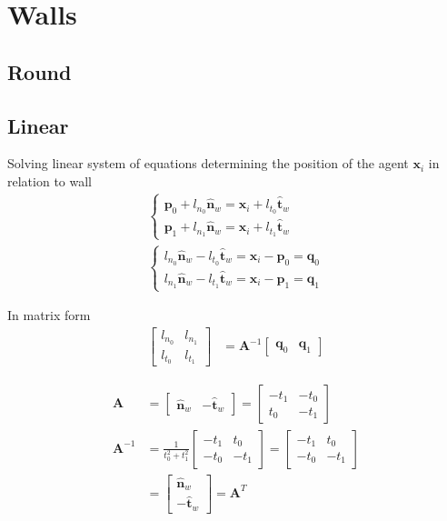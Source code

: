 \section{Walls}
\subsection{Round}

\subsection{Linear}
Solving linear system of equations determining the position of the agent $ \mathbf{x}_{i} $ in relation to wall
\begin{align}
\begin{cases}
\mathbf{p}_{0} + l_{n_0} \hat{\mathbf{n}}_{w} = \mathbf{x}_{i} + l_{t_0} \hat{\mathbf{t}}_{w} \\
\mathbf{p}_{1} + l_{n_1} \hat{\mathbf{n}}_{w} = \mathbf{x}_{i} + l_{t_1} \hat{\mathbf{t}}_{w}
\end{cases} 
\\
\begin{cases}
l_{n_0} \hat{\mathbf{n}}_{w} - l_{t_0} \hat{\mathbf{t}}_{w} = \mathbf{x}_{i} - \mathbf{p}_{0} =  \mathbf{q}_{0} \\
l_{n_1} \hat{\mathbf{n}}_{w} - l_{t_1} \hat{\mathbf{t}}_{w} = \mathbf{x}_{i} - \mathbf{p}_{1} = \mathbf{q}_{1}
\end{cases}
\end{align}

In matrix form
\begin{align}
\begin{bmatrix} l_{n_0} & l_{n_1} \\ l_{t_0} & l_{t_1} \end{bmatrix} &= \mathbf{A}^{-1} \begin{bmatrix} \mathbf{q}_{0} & \mathbf{q}_{1} \end{bmatrix}
\end{align}

\begin{align}
\mathbf{A} 
&= \begin{bmatrix} \hat{\mathbf{n}}_{w} & -\hat{\mathbf{t}}_{w} \end{bmatrix} 
= \left[\begin{matrix}- t_{1} & - t_{0}\\t_{0} & - t_{1}\end{matrix}\right] \\
\mathbf{A}^{-1} 
&= \frac{1}{t_{0}^{2} + t_{1}^{2}} \left[\begin{matrix}- t_{1} & t_{0}\\- t_{0} & - t_{1}\end{matrix}\right]
= \left[\begin{matrix}- t_{1} & t_{0}\\- t_{0} & - t_{1}\end{matrix}\right] \\
&= \begin{bmatrix} \hat{\mathbf{n}}_{w} \\ -\hat{\mathbf{t}}_{w} \end{bmatrix} = \mathbf{A}^{T}
\end{align}

